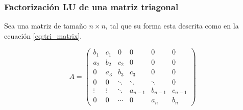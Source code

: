 \subsubsection{Factorización LU de una matriz triagonal}

Sea una matriz de tamaño $n \times n$, tal que su forma esta descrita como en la ecuación \ref{eq:tri_matrix}\cite{el_2003}.

\begin{equation}
    A= \begin{pmatrix}
        b_1    & c_1    & 0      & 0       & 0       & 0       \\
        a_2    & b_2    & c_2    & 0       & 0       & 0       \\
        0      & a_3    & b_3    & c_3     & 0       & 0       \\
        0      & 0      & \ddots & \ddots  & \ddots  & 0       \\
        \vdots & \vdots & \ddots & a_{n-1} & b_{n-1} & c_{n-1} \\
        0      & 0      & \cdots & 0       & a_n     & b_n
    \end{pmatrix}
    \label{eq:tri_matrix}
\end{equation}

